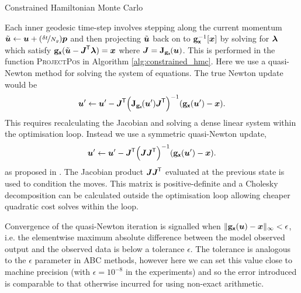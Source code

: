 \begin{algorithm}[!t]
\caption{Constrained Hamiltonian Monte Carlo}
\label{alg:constrained_hmc}
{
\small

}
\end{algorithm}

Each inner geodesic time-step involves stepping along the current momentum  $\tilde{\boldsymbol{u}} \gets \boldsymbol{u} + (\nicefrac{\delta t}{N_g}) \boldsymbol{p}$ and then projecting $\tilde{\boldsymbol{u}}$ back on to ${\mathbf{g}}_{\boldsymbol{\mathsf{x}}}^{-1}[\boldsymbol{x}]$ by solving for $\boldsymbol{\lambda}$ which satisfy ${\mathbf{g}}_{\boldsymbol{\mathsf{x}}}(\tilde{\boldsymbol{u}} - \boldsymbol{J}^{\mkern-1.5mu\mathsf{T}}\boldsymbol{\lambda}) = \boldsymbol{x}$ where $\mtx{J} = \jacob{\genfunc_{\rvct{x}}}{\vct{u}}$. This is performed in the function \textsc{ProjectPos} in Algorithm \ref{alg:constrained_hmc}. Here we use a quasi-Newton method for solving the system of equations. The true Newton update would be
\begin{equation}\label{eq:newton-iteration}
    \vct{u}'\gets \vct{u}' - 
    \mtx{J}\tr
    \lpa 
        \jacob{\genfunc_{\rvct{x}}}{\vct{u}'}\mtx{J}\tr
    \rpa^{-1}
    \lpa \genfunc_{\rvct{x}}(\vct{u}') - \vct{x} \rpa.
\end{equation}
This requires recalculating the Jacobian and solving a dense linear system within the optimisation loop. Instead we use a symmetric quasi-Newton update, 
\begin{equation}\label{eq:quasi-newton-iteration}
    \vct{u}'\gets \vct{u}' - 
    \mtx{J}\tr
    \lpa 
        \mtx{J}\mtx{J}\tr
    \rpa^{-1}
    \lpa \genfunc_{\rvct{x}}(\vct{u}') - \vct{x} \rpa.
\end{equation}
as proposed in \citep{barth1995algorithms}. The Jacobian product $\boldsymbol{J}\boldsymbol{J}^{\mkern-1.5mu\mathsf{T}}$ evaluated at the previous state is used to condition the moves. This matrix is positive-definite and a Cholesky decomposition can be calculated outside the optimisation loop allowing cheaper quadratic cost solves within the loop. 

Convergence of the quasi-Newton iteration is signalled when $\Vert {\mathbf{g}}_{\boldsymbol{\mathsf{x}}}(\boldsymbol{u}) - \boldsymbol{x}\Vert_\infty < \epsilon$, i.e. the elementwise maximum absolute difference between the model observed output and the observed data is below a tolerance $\epsilon$. The tolerance is analogous to the $\epsilon$ parameter in \ac{ABC} methods, however here we can set this value close to machine precision (with $\epsilon = 10^{-8}$ in the experiments) and so the error introduced is comparable to that otherwise incurred for using non-exact arithmetic.

